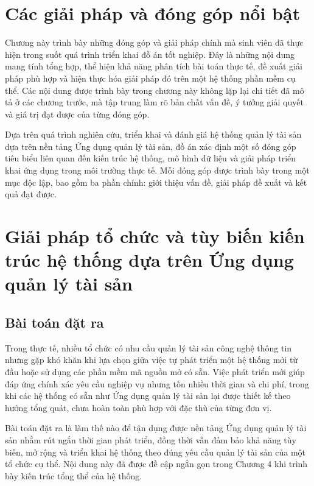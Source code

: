 \documentclass[../DoAn.tex]{subfiles}
\begin{document}
\section{Các giải pháp và đóng góp nổi bật}

Chương này trình bày những đóng góp và giải pháp chính mà sinh viên đã thực hiện trong suốt quá trình triển khai đồ án tốt nghiệp. Đây là những nội dung mang tính tổng hợp, thể hiện khả năng phân tích bài toán thực tế, đề xuất giải pháp phù hợp và hiện thực hóa giải pháp đó trên một hệ thống phần mềm cụ thể. Các nội dung được trình bày trong chương này không lặp lại chi tiết đã mô tả ở các chương trước, mà tập trung làm rõ bản chất vấn đề, ý tưởng giải quyết và giá trị đạt được của từng đóng góp.

Dựa trên quá trình nghiên cứu, triển khai và đánh giá hệ thống quản lý tài sản dựa trên nền tảng Ứng dụng quản lý tài sản, đồ án xác định một số đóng góp tiêu biểu liên quan đến kiến trúc hệ thống, mô hình dữ liệu và giải pháp triển khai ứng dụng trong môi trường thực tế. Mỗi đóng góp được trình bày trong một mục độc lập, bao gồm ba phần chính: giới thiệu vấn đề, giải pháp đề xuất và kết quả đạt được.

\section{Giải pháp tổ chức và tùy biến kiến trúc hệ thống dựa trên Ứng dụng quản lý tài sản}

\subsection{Bài toán đặt ra}

Trong thực tế, nhiều tổ chức có nhu cầu quản lý tài sản công nghệ thông tin nhưng gặp khó khăn khi lựa chọn giữa việc tự phát triển một hệ thống mới từ đầu hoặc sử dụng các phần mềm mã nguồn mở có sẵn. Việc phát triển mới giúp đáp ứng chính xác yêu cầu nghiệp vụ nhưng tốn nhiều thời gian và chi phí, trong khi các hệ thống có sẵn như Ứng dụng quản lý tài sản lại được thiết kế theo hướng tổng quát, chưa hoàn toàn phù hợp với đặc thù của từng đơn vị.

Bài toán đặt ra là làm thế nào để tận dụng được nền tảng Ứng dụng quản lý tài sản nhằm rút ngắn thời gian phát triển, đồng thời vẫn đảm bảo khả năng tùy biến, mở rộng và triển khai hệ thống theo đúng yêu cầu quản lý tài sản của một tổ chức cụ thể. Nội dung này đã được đề cập ngắn gọn trong Chương 4 khi trình bày kiến trúc tổng thể của hệ thống.
\end{document}
